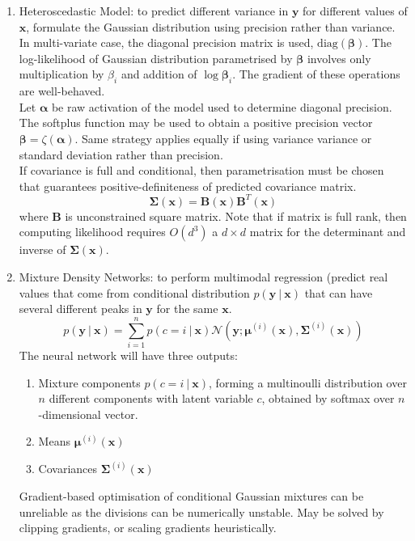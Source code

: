 \begin{remark} 
\begin{enumerate}[label=\roman*.]
\setlength{\itemsep}{0pt}
\item Heteroscedastic Model: to predict different variance in $\bm{y}$ for different values of $\bm{x}$, formulate the Gaussian distribution using precision rather than variance. In multi-variate case, the diagonal precision matrix is used, $\text{diag}(\bm{\beta})$. The log-likelihood of Gaussian distribution parametrised by $\bm{\beta}$ involves only multiplication by $\beta_i$ and addition of $\log \bm{\beta}_i$. The gradient of these operations are well-behaved.\\
Let $\bm{\alpha}$ be raw activation of the model used to determine diagonal precision. The softplus function may be used to obtain a positive precision vector $\bm{\beta} = \zeta(\bm{\alpha})$. Same strategy applies equally if using variance variance or standard deviation rather than precision.\\
If covariance is full and conditional, then parametrisation must be chosen that guarantees positive-definiteness of predicted covariance matrix.
\begin{equation}
\bm{\Sigma}(\bm{x}) = \bm{B}(\bm{x}) \bm{B}^T(\bm{x}) \nonumber
\end{equation}
where $\bm{B}$ is unconstrained square matrix. Note that if matrix is full rank, then computing likelihood requires $O(d^3)$ a $d \times d$ matrix for the determinant and inverse of $\bm{\Sigma}(\bm{x})$.
\item Mixture Density Networks: to perform multimodal regression (predict real values that come from conditional distribution $p(\bm{y} \ \vert \ \bm{x})$ that can have several different peaks in $\bm{y}$ for the same $\bm{x}$.
\begin{equation}
p(\bm{y} \ \vert \ \bm{x}) = \sum\limits_{i=1}^n p(c=i \ \vert \ \bm{x}) \mathcal{N}(\bm{y}; \bm{\mu}^{(i)} (\bm{x}), \bm{\Sigma}^{(i)} (\bm{x})) \nonumber
\end{equation}
The neural network will have three outputs:
\begin{enumerate}[label=\arabic*.]
\setlength{\itemsep}{0pt}
\item Mixture components $p(c = i \ \vert \ \bm{x})$, forming a multinoulli distribution over $n$ different components with latent variable $c$, obtained by softmax over $n$-dimensional vector.
\item Means $\bm{\mu}^{(i)}(\bm{x})$
\item Covariances $\bm{\Sigma}^{(i)}(\bm{x})$
\end{enumerate}
Gradient-based optimisation of conditional Gaussian mixtures can be unreliable as the divisions can be numerically unstable. May be solved by clipping gradients, or scaling gradients heuristically.
\end{enumerate}
\end{remark}


